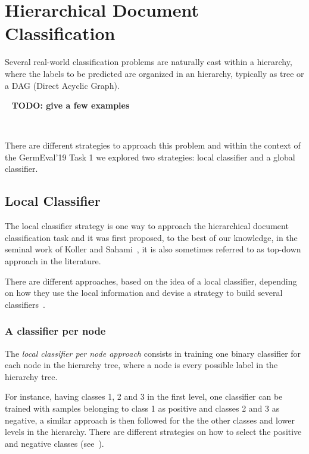 \documentclass[11pt,a4paper]{article}
\begin{document}


\section{Hierarchical Document Classification}\label{hierarchical-clf}


Several real-world classification problems are naturally cast within a hierarchy,
where the labels to be predicted are organized in an hierarchy, typically as
tree or a DAG (Direct Acyclic Graph).

\ \newline
\textbf{TODO: give a few examples}


\ \newline

There are different strategies to approach this problem and within the context
of the GermEval'19 Task 1 we explored two strategies: local classifier and a
global classifier.


\subsection{Local Classifier}

The local classifier strategy is one way to approach the hierarchical document classification task
and it was first proposed, to the best of our knowledge, in the seminal work of Koller and
Sahami~, it is also sometimes referred to as top-down
approach in the literature.

There are different approaches, based on the idea of a local classifier, depending on how they use
the local information and devise a strategy to build several classifiers~\cite{Silla:2011:SHC:1937796.1937884}.


\subsubsection{A classifier per node} %
The \textit{local classifier per node approach} consists in training one binary classifier for each
node in the hierarchy tree, where a node is every possible label in the hierarchy tree.

For instance, having classes 1, 2 and 3 in the first level, one classifier can be trained with
samples belonging to class 1 as positive and classes 2 and 3 as negative, a similar approach is then
followed for the the other classes and lower levels in the hierarchy. There are different strategies
on how to select the positive and negative classes (see~\cite{}).
\end{document}
